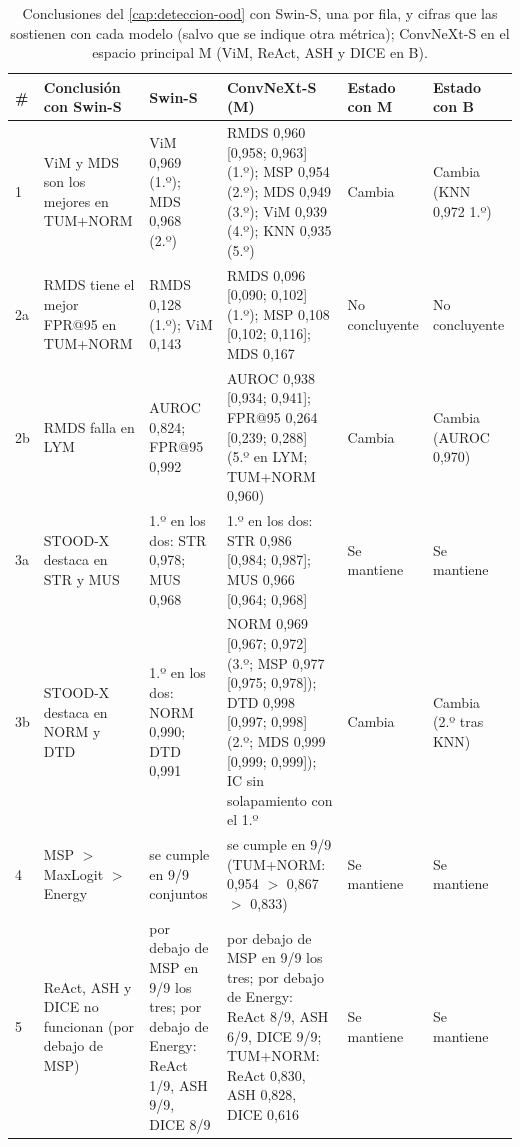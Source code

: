 \begin{table}
\centering
\scriptsize
\setlength{\tabcolsep}{3pt}
\caption{Conclusiones del \cref{cap:deteccion-ood} con Swin-S, una por fila, y cifras que las sostienen con cada modelo (\AUROC salvo que se indique otra métrica); ConvNeXt-S en el espacio principal M (ViM, ReAct, ASH y DICE en B).}
\label{tab:convnext-conclusiones}
\begin{tabularx}{\textwidth}{@{}l>{\raggedright\arraybackslash}p{2.2cm}>{\raggedright\arraybackslash}X>{\raggedright\arraybackslash}X>{\raggedright\arraybackslash}p{1.3cm}>{\raggedright\arraybackslash}p{1.6cm}@{}}
\toprule
\# & Conclusión con Swin-S & Swin-S & ConvNeXt-S (M) & Estado con M & Estado con B \\
\midrule
1 & ViM y MDS son los mejores en TUM+NORM & ViM 0,969 (1.º); MDS 0,968 (2.º) & RMDS 0,960 [0,958; 0,963] (1.º); MSP 0,954 (2.º); MDS 0,949 (3.º); ViM 0,939 (4.º); KNN 0,935 (5.º) & Cambia & Cambia (KNN 0,972 1.º) \\
2a & RMDS tiene el mejor FPR@95 en TUM+NORM & RMDS 0,128 (1.º); ViM 0,143 & RMDS 0,096 [0,090; 0,102] (1.º); MSP 0,108 [0,102; 0,116]; MDS 0,167 & No concluyente & No concluyente \\
2b & RMDS falla en LYM & AUROC 0,824; FPR@95 0,992 & AUROC 0,938 [0,934; 0,941]; FPR@95 0,264 [0,239; 0,288] (5.º en LYM; TUM+NORM 0,960) & Cambia & Cambia (AUROC 0,970) \\
3a & STOOD-X destaca en STR y MUS & 1.º en los dos: STR 0,978; MUS 0,968 & 1.º en los dos: STR 0,986 [0,984; 0,987]; MUS 0,966 [0,964; 0,968] & Se mantiene & Se mantiene \\
3b & STOOD-X destaca en NORM y DTD & 1.º en los dos: NORM 0,990; DTD 0,991 & NORM 0,969 [0,967; 0,972] (3.º; MSP 0,977 [0,975; 0,978]); DTD 0,998 [0,997; 0,998] (2.º; MDS 0,999 [0,999; 0,999]); IC sin solapamiento con el 1.º & Cambia & Cambia (2.º tras KNN) \\
4 & MSP $>$ MaxLogit $>$ Energy & se cumple en 9/9 conjuntos & se cumple en 9/9 (TUM+NORM: 0,954 $>$ 0,867 $>$ 0,833) & Se mantiene & Se mantiene \\
5 & ReAct, ASH y DICE no funcionan (por debajo de MSP) & por debajo de MSP en 9/9 los tres; por debajo de Energy: ReAct 1/9, ASH 9/9, DICE 8/9 & por debajo de MSP en 9/9 los tres; por debajo de Energy: ReAct 8/9, ASH 6/9, DICE 9/9; TUM+NORM: ReAct 0,830, ASH 0,828, DICE 0,616 & Se mantiene & Se mantiene \\

\end{tabularx}
\end{table}
